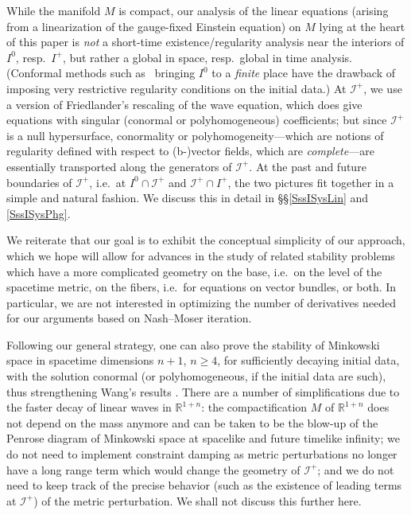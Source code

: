 \documentclass[reqno,11pt,letterpaper]{amsart}
\numberwithin{equation}{section}
\numberwithin{figure}{section}
\theoremstyle{definition}
\theoremstyle{remark}
\newcommand{\ms}{\mathscr}
\newcommand{\scri}{\ms I}
\newcommand{\R}{\mathbb{R}}
\begin{document}
While the manifold $M$ is compact, our analysis of the linear equations (arising from a linearization of the gauge-fixed Einstein equation) on $M$ lying at the heart of this paper is \emph{not} a short-time existence/regularity analysis near the interiors of $I^0$, resp.\ $I^+$, but rather a global in space, resp.\ global in time analysis. (Conformal methods such as~\cite{FriedrichSpaceConformal} bringing  $I^0$ to a \emph{finite} place have the drawback of imposing very restrictive regularity conditions on the initial data.) At $\scri^+$, we use a version of Friedlander's rescaling \cite{FriedlanderRadiation} of the wave equation, which does give equations with singular (conormal or polyhomogeneous) coefficients; but since $\scri^+$ is a null hypersurface, conormality or polyhomogeneity---which are notions of regularity defined with respect to (b-)vector fields, which are \emph{complete}---are essentially transported along the generators of $\scri^+$. At the past and future boundaries of $\scri^+$, i.e.\ at $I^0\cap\scri^+$ and $\scri^+\cap I^+$, the two pictures fit together in a simple and natural fashion. We discuss this in detail in \S\S\ref{SssISysLin} and \ref{SssISysPhg}.

We reiterate that our goal is to exhibit the conceptual simplicity of our approach, which we hope will allow for advances in the study of related stability problems which have a more complicated geometry on the base, i.e.\ on the level of the spacetime metric, on the fibers, i.e.\ for equations on vector bundles, or both. In particular, we are not interested in optimizing the number of derivatives needed for our arguments based on Nash--Moser iteration.

Following our general strategy, one can also prove the stability of Minkowski space in spacetime dimensions $n+1$, $n\geq 4$, for sufficiently decaying initial data, with the solution conormal (or polyhomogeneous, if the initial data are such), thus strengthening Wang's results \cite{WangRadiation}. There are a number of simplifications due to the faster decay of linear waves in $\R^{1+n}$: the compactification $M$ of $\R^{1+n}$ does not depend on the mass anymore and can be taken to be the blow-up of the Penrose diagram of Minkowski space at spacelike and future timelike infinity; we do not need to implement constraint damping as metric perturbations no longer have a long range term which would change the geometry of $\scri^+$; and we do not need to keep track of the precise behavior (such as the existence of leading terms at $\scri^+$) of the metric perturbation. We shall not discuss this further here.
\end{document}
